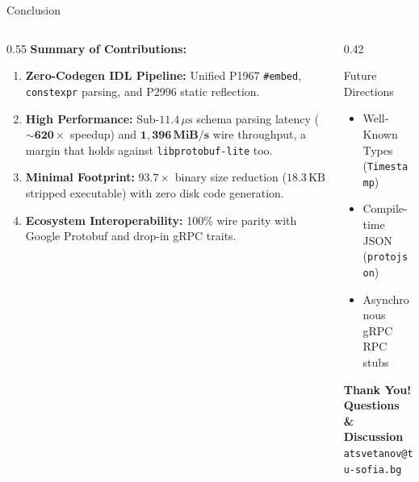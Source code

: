 \documentclass[aspectratio=169,10pt]{beamer}
\begin{document}
\begin{frame}{Conclusion}
  \begin{columns}[T]
    \begin{column}{0.55\textwidth}
      \textbf{Summary of Contributions:}
      \begin{enumerate}
        \item \textbf{Zero-Codegen IDL Pipeline:} Unified P1967 \texttt{\#embed}, \texttt{constexpr} parsing, and P2996 static reflection.
        \item \textbf{High Performance:} Sub-$11.4\,\mu\text{s}$ schema parsing latency ($\mathbf{\sim 620\times}$ speedup) and $\mathbf{1{,}396\,\text{MiB/s}}$ wire throughput, a margin that holds against \texttt{libprotobuf-lite} too.
        \item \textbf{Minimal Footprint:} $\mathbf{93.7\times}$ binary size reduction ($18.3\,\text{KB}$ stripped executable) with zero disk code generation.
        \item \textbf{Ecosystem Interoperability:} 100\% wire parity with Google Protobuf and drop-in gRPC traits.
      \end{enumerate}
    \end{column}

    \begin{column}{0.42\textwidth}
      \begin{exampleblock}{Future Directions}
        \begin{itemize}
          \item Well-Known Types (\texttt{Timestamp})
          \item Compile-time JSON (\texttt{protojson})
          \item Asynchronous gRPC RPC stubs
        \end{itemize}
      \end{exampleblock}
      \vspace{1em}
      \centering
      \textbf{\Large Thank You!}\\[0.5em]
      \textbf{Questions \& Discussion}\\[0.5em]
      \texttt{atsvetanov@tu-sofia.bg}
    \end{column}
  \end{columns}
\end{frame}
\end{document}
